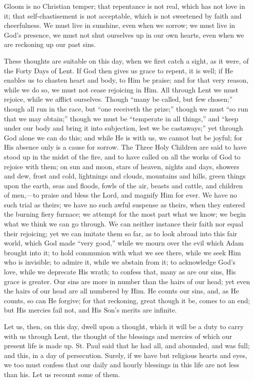 Gloom is no Christian temper; that repentance is not real, which
has not love in it; that self-chastisement is not acceptable, which is
not sweetened by faith and cheerfulness. We must live in sunshine,
even when we sorrow; we must live in God's presence, we must not shut
ourselves up in our own hearts, even when we are reckoning up our past
sins.

These thoughts are suitable on this day, when we first catch a
sight, as it were, of the Forty Days of Lent. If God then gives us
grace to repent, it is well; if He enables us to chasten heart and
body, to Him be praise; and for that very reason, while we do so, we
must not cease rejoicing in Him. All through Lent we must rejoice,
while we afflict ourselves. Though ``many be called, but few
chosen;'' though all run in the race, but ``one receiveth the
prize;'' though we must ``so run that we may obtain;''
though we must be ``temperate in all things,'' and ``keep
under our body and bring it into subjection, lest we be
castaways;'' yet through God alone we can do this; and while He is
with us, we cannot but be joyful; for His absence only is a cause for
sorrow. The Three Holy Children are said to have stood up in the midst
of the fire, and to have called on all the works of God to rejoice
with them; on sun and moon, stars of heaven, nights and days, showers
and dew, frost and cold, lightnings and clouds, mountains and hills,
green things upon the earth, seas and floods, fowls of the air, beasts
and cattle, and children of men,—to praise and bless the Lord, and
magnify Him for ever. We have no such trial as theirs; we have no such
awful suspense as theirs, when they entered the burning fiery furnace;
we attempt for the most part what we know; we begin what we think we
can go through. We can neither instance their faith nor equal their
rejoicing; yet we can imitate them so far, as to look abroad into this
fair world, which God made ``very good,'' while we mourn over
the evil which Adam brought into it; to hold communion with what we
see there, while we seek Him who is invisible; to admire it, while we
abstain from it; to acknowledge God's love, while we deprecate His
wrath; to confess that, many as are our sins, His grace is greater.
Our sins are more in number than the hairs of our head; yet even the
hairs of our head are all numbered by Him. He counts our sins, and, as
He counts, so can He forgive; for that reckoning, great though it be,
comes to an end; but His mercies fail not, and His Son's merits are
infinite.

Let us, then, on this day, dwell upon a thought, which it will be a
duty to carry with us through Lent, the thought of the blessings and
mercies of which our present life is made up. St. Paul said that he
had all, and abounded, and was full; and this, in a day of
persecution. Surely, if we have but religious hearts and eyes, we too
must confess that our daily and hourly blessings in this life are not
less than his. Let us recount some of them.

